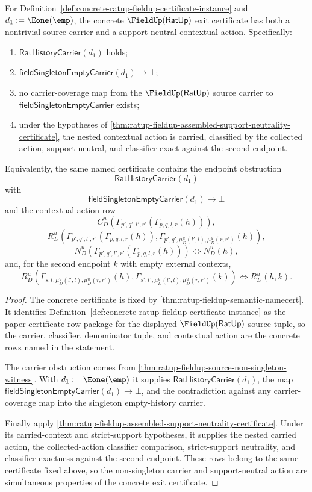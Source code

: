 \begin{theorem}
\label{thm:ratup-fieldup-exit-certificate-nontrivial-support-neutral}
For Definition~\ref{def:concrete-ratup-fieldup-certificate-instance} and
$d_1:=\Eone(\emp)$, the concrete $\FieldUp(\mathsf{RatUp})$ exit certificate has
both a nontrivial source carrier and a support-neutral contextual action.
Specifically:
\begin{enumerate}
  \item $\mathsf{RatHistoryCarrier}(d_1)$ holds;
  \item $\mathsf{fieldSingletonEmptyCarrier}(d_1)\to\bot$;
  \item no carrier-coverage map from the $\FieldUp(\mathsf{RatUp})$ source
  carrier to $\mathsf{fieldSingletonEmptyCarrier}$ exists;
  \item under the hypotheses of
  \autoref{thm:ratup-fieldup-assembled-support-neutrality-certificate}, the
  nested contextual action is carried, classified by the collected action,
  support-neutral, and classifier-exact against the second endpoint.
\end{enumerate}
Equivalently, the same named certificate contains the endpoint obstruction
$$
\mathsf{RatHistoryCarrier}(d_1)
$$
with
$$
\mathsf{fieldSingletonEmptyCarrier}(d_1)\to\bot
$$
and the contextual-action row
$$
C_D^u(\Gamma_{p',q',l',r'}(\Gamma_{p,q,l,r}(h))),
$$
$$
R_D^u(\Gamma_{p',q',l',r'}(\Gamma_{p,q,l,r}(h)),
\Gamma_{p',q',\mu_D^u(l',l),\mu_D^u(r,r')}(h)),
$$
$$
N_D^u(\Gamma_{p',q',l',r'}(\Gamma_{p,q,l,r}(h)))
\Longleftrightarrow N_D^u(h),
$$
and, for the second endpoint $k$ with empty external contexts,
$$
R_D^u(\Gamma_{s,t,\mu_D^u(l',l),\mu_D^u(r,r')}(h),
\Gamma_{s',t',\mu_D^u(l',l),\mu_D^u(r,r')}(k))
\Longleftrightarrow R_D^u(h,k).
$$
\end{theorem}
\begin{proof}
The concrete certificate is fixed by
\autoref{thm:ratup-fieldup-semantic-namecert}. It identifies
Definition~\ref{def:concrete-ratup-fieldup-certificate-instance} as the
paper certificate row package for the displayed $\FieldUp(\mathsf{RatUp})$
source tuple, so the carrier, classifier, denominator tuple, and contextual
action are the concrete rows named in the statement.

The carrier obstruction comes from
\autoref{thm:ratup-fieldup-source-non-singleton-witness}. With
$d_1:=\Eone(\emp)$ it supplies $\mathsf{RatHistoryCarrier}(d_1)$, the map
$\mathsf{fieldSingletonEmptyCarrier}(d_1)\to\bot$, and the contradiction
against any carrier-coverage map into the singleton empty-history carrier.

Finally apply
\autoref{thm:ratup-fieldup-assembled-support-neutrality-certificate}. Under
its carried-context and strict-support hypotheses, it supplies the nested
carried action, the collected-action classifier comparison, strict-support
neutrality, and classifier exactness against the second endpoint. These rows
belong to the same certificate fixed above, so the non-singleton carrier and
support-neutral action are simultaneous properties of the concrete exit
certificate.
\end{proof}
